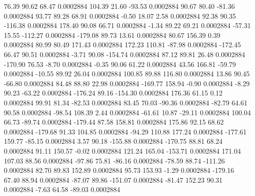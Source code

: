        76.39       90.62       68.47     0.0002884
      104.39       21.60      -93.53     0.0002884
       90.67       80.40      -81.36     0.0002884
       93.77       89.28       68.91     0.0002884
       -0.50       18.07        2.58     0.0002884
       92.38       90.35     -116.38     0.0002884
      178.40       90.08       66.71     0.0002884
       -1.34       89.22       69.21     0.0002884
      -57.31       15.55     -112.27     0.0002884
     -179.08       89.73       13.61     0.0002884
       80.67      156.39        0.39     0.0002884
       80.99       80.49      171.43     0.0002884
      172.23      110.81      -87.98     0.0002884
     -172.45       66.47       90.51     0.0002884
       -3.71       90.08     -154.74     0.0002884
       87.12       89.81       26.48     0.0002884
     -170.90       76.53       -8.70     0.0002884
       -0.35       90.06       61.22     0.0002884
       43.56      166.81      -59.79     0.0002884
      -10.55       89.92       26.04     0.0002884
      100.85       89.88      116.80     0.0002884
       13.86       90.45      -66.80     0.0002884
       84.48       88.80       22.98     0.0002884
     -169.77      158.94       -0.90     0.0002884
       -8.29       90.23      -63.22     0.0002884
     -176.24       89.16     -154.30     0.0002884
      176.36       61.15        0.12     0.0002884
       99.91       81.34      -82.53     0.0002884
       83.45       70.03      -90.36     0.0002884
      -82.79       64.61       90.58     0.0002884
      -98.54      108.39        2.44     0.0002884
      -61.61       10.87      -29.11     0.0002884
      100.04       66.73      -89.74     0.0002884
     -179.44       87.58      158.81     0.0002884
      175.86       92.15       68.62     0.0002884
     -179.68       91.33      104.85     0.0002884
      -94.29      110.88      177.24     0.0002884
     -177.61      159.77      -85.15     0.0002884
        3.57       90.18     -155.88     0.0002884
     -170.75       88.81       68.24     0.0002884
       91.11      150.57       -0.02     0.0002884
      121.24      165.04     -153.71     0.0002884
      171.04      107.03       88.56     0.0002884
      -97.86       75.81      -86.16     0.0002884
      -78.59       88.74     -111.26     0.0002884
       82.70       89.83      152.89     0.0002884
       95.73      153.93       -1.29     0.0002884
     -179.16       67.40       88.94     0.0002884
      -87.07       89.86     -151.07     0.0002884
      -81.47      152.23       90.31     0.0002884
       -7.63       64.58      -89.03     0.0002884
